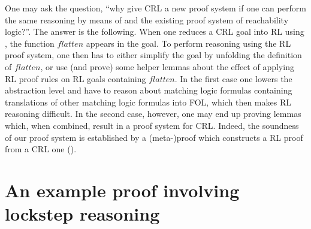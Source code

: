 One may ask the question, ``why give CRL a new proof system if one can perform the same reasoning
by means of  and the existing proof system of reachability logic?''.
The answer is the following.
When one reduces a CRL goal into RL using ,
the function $\mathit{flatten}$ appears in the goal.
To perform reasoning using the RL proof system, one then has to either simplify the goal
by unfolding the definition of $\mathit{flatten}$,
or use (and prove) some helper lemmas about the effect of applying RL proof rules
on RL goals containing $\mathit{flatten}$.
In the first case one lowers the abstraction level and have to reason about matching logic formulas
containing translations of other matching logic formulas into FOL, which then makes RL reasoning difficult.
In the second case, however, one may end up proving lemmas which, when combined, result in a proof system for CRL.
Indeed, the soundness of our proof system
is established by a (meta-)proof which constructs a RL proof from a CRL one ().

\section{An example proof involving lockstep reasoning}\label{sec:example}

